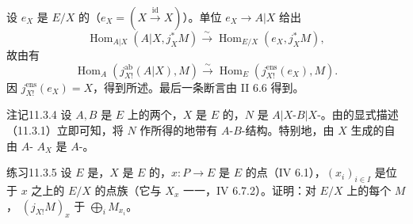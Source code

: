 设 $e_X$ 是 $E/X$ 的（$e_X=(X\xrightarrow{\mathrm{id}}X)$）。单位 $e_X\to A|X$ 给出
\[\operatorname{Hom}_{A|X}(A|X,j_X^*M)\xrightarrow{\sim}\operatorname{Hom}_{E/X}(e_X,j_X^*M),\]
故由有
\[\operatorname{Hom}_A(j_{X!}^{\mathrm{ab}}(A|X),M)\xrightarrow{\sim}\operatorname{Hom}_E(j_{X!}^{\mathrm{ens}}(e_X),M).\]
因 $j_{X!}^{\mathrm{ens}}(e_X)=X$，得到所述。最后一条断言由 II 6.6 得到。
\begin{SGAresult}{注记}{11.3.4}
设 $A,B$ 是 $E$ 上的两个，$X$ 是 $E$ 的，$N$ 是 $A|X$-$B|X$-。由的显式描述（11.3.1）立即可知，将 $N$ 作所得的地带有 $A$-$B$-结构。特别地，由 $X$ 生成的自由 $A$- $A_X$ 是 $A$-。
\end{SGAresult}
\begin{SGAresult}{练习}{11.3.5}
设 $E$ 是，$X$ 是 $E$ 的，$x:P\to E$ 是 $E$ 的点（IV 6.1），$(x_i)_{i\in I}$ 是位于 $x$ 之上的 $E/X$ 的点族（它与 $X_x$ 一一，IV 6.7.2）。证明：对 $E/X$ 上的每个 $M$， $(j_{X!}M)_x$ 于 $\bigoplus_i M_{x_i}$。
\end{SGAresult}

